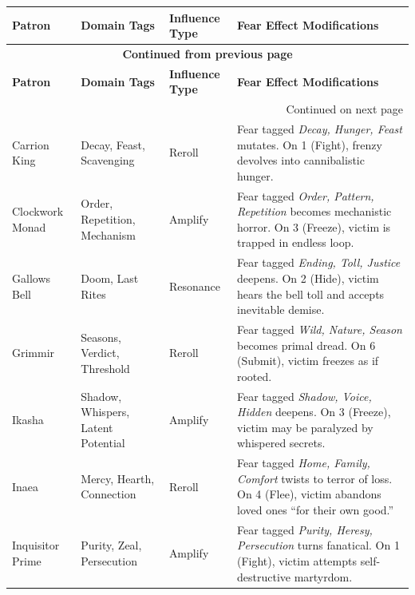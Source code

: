 \begin{longtable}{@{}p{3.2cm}p{4.5cm}p{2.8cm}p{5.9cm}@{}}
\toprule
\textbf{Patron} & \textbf{Domain Tags} & \textbf{Influence Type} & \textbf{Fear Effect Modifications} \\
\midrule
\endfirsthead

\multicolumn{4}{c}{{\bfseries Continued from previous page}} \\
\toprule
\textbf{Patron} & \textbf{Domain Tags} & \textbf{Influence Type} & \textbf{Fear Effect Modifications} \\
\midrule
\endhead

\midrule
\multicolumn{4}{r}{{Continued on next page}} \\
\endfoot

\bottomrule
\endlastfoot

Carrion King & Decay, Feast, Scavenging & Reroll & 
Fear tagged \emph{Decay, Hunger, Feast} mutates. On 1 (Fight), frenzy devolves into cannibalistic hunger. \\

Clockwork Monad & Order, Repetition, Mechanism & Amplify & 
Fear tagged \emph{Order, Pattern, Repetition} becomes mechanistic horror. On 3 (Freeze), victim is trapped in endless loop. \\

Gallows Bell & Doom, Last Rites & Resonance & 
Fear tagged \emph{Ending, Toll, Justice} deepens. On 2 (Hide), victim hears the bell toll and accepts inevitable demise. \\

Grimmir & Seasons, Verdict, Threshold & Reroll & 
Fear tagged \emph{Wild, Nature, Season} becomes primal dread. On 6 (Submit), victim freezes as if rooted. \\

Ikasha & Shadow, Whispers, Latent Potential & Amplify & 
Fear tagged \emph{Shadow, Voice, Hidden} deepens. On 3 (Freeze), victim may be paralyzed by whispered secrets. \\

Inaea & Mercy, Hearth, Connection & Reroll & 
Fear tagged \emph{Home, Family, Comfort} twists to terror of loss. On 4 (Flee), victim abandons loved ones ``for their own good.'' \\

Inquisitor Prime & Purity, Zeal, Persecution & Amplify & 
Fear tagged \emph{Purity, Heresy, Persecution} turns fanatical. On 1 (Fight), victim attempts self-destructive martyrdom. \\


\end{longtable}
